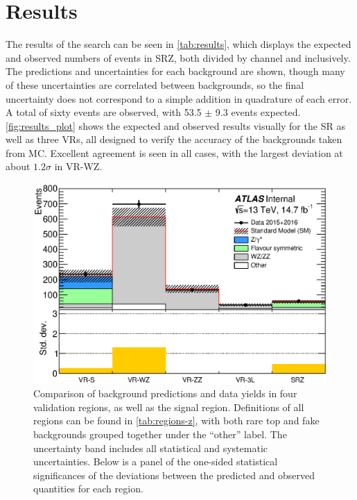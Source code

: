 
\chapter{Results} %

\label{ch:results} 

The results of the search can be seen in \autoref{tab:results}, which displays the expected and observed numbers of events in SRZ, both divided by channel and inclusively. The predictions and uncertainties for each background are shown, though many of these uncertainties are correlated between backgrounds, so the final uncertainty does not correspond to a simple addition in quadrature of each error. A total of sixty events are observed, with 53.5 $\pm$ 9.3 events expected. \autoref{fig:results_plot} shows the expected and observed results visually for the \ac{SR} as well as three \acp{VR}, all designed to verify the accuracy of the backgrounds taken from \ac{MC}. Excellent agreement is seen in all cases, with the largest deviation at about $1.2\sigma$ in VR-WZ.

\begin{centering}
\begin{figure}[!hbt]
\myfloatalign
\includegraphics[width=.9\linewidth]{figures/results/makeSummaryPlot_linear.eps}
\caption{Comparison of background predictions and data yields in four validation regions, as well as the signal region. Definitions of all regions can be found in \autoref{tab:regions-z}, with both rare top and fake backgrounds grouped together under the ``other'' label. The uncertainty band includes all statistical and systematic uncertainties. Below is a panel of the one-sided statistical significances of the deviations between the predicted and observed quantities for each region.}
\label{fig:results_plot}
\end{figure}
\end{centering}

